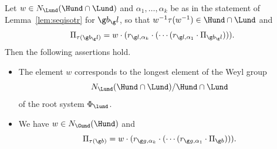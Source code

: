 \documentclass[12pt]{amsart}
\begin{document}
\begin{prp}
\label{prp:goodBorel}
Let $w\in N_{\Lund}(\Hund\cap\Lund)$ and 
$\alpha_1,\ldots,\alpha_k$ be  as in the statement of Lemma~\ref{lem:seqisotr} for $\g b_\g l$, so that 
$w^{-1}\tau(w^{-1})\in \Hund\cap\Lund$ and
\begin{equation}
\label{eq:Pitabll}
\Pi_{\tau(\g b_\g l)}=
w\cdot (r_{\g l,\alpha_k}\cdot (\cdots( r_{\g l,\alpha_1}\cdot \Pi_{\g b_\g l}))).
\end{equation}
Then the following assertions hold.
\begin{itemize}
\item[\rm (i)] The element $w$  corresponds to the longest element of the Weyl group 
\[
N_{\Lund}(\Hund\cap\Lund)/\Hund\cap\Lund
\]
of the root system $\Phi_{\lund}$.
\item[\rm (ii)]
We have $w\in N_{\Gund}(\Hund)$ and 
\begin{equation}
\label{eq:taub-and-b}
\Pi_{\tau(\g b)}=
w\cdot (r_{\g g,\alpha_k}\cdot (\cdots( r_{\g g,\alpha_1}\cdot \Pi_{\g b}))).
\end{equation}
\end{itemize}
\end{prp}
\end{document}
